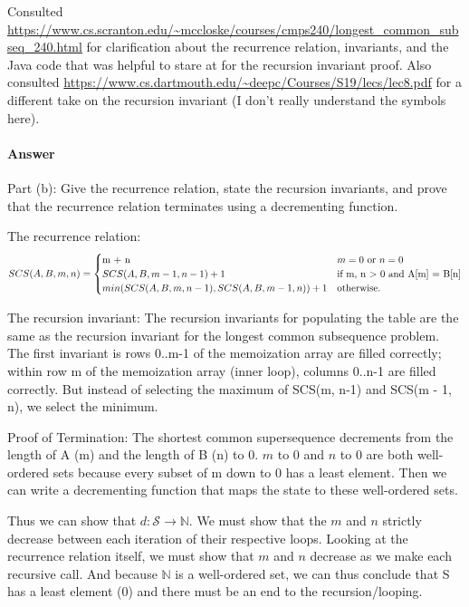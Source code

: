 \documentclass{article}
\begin{document}
Consulted \url{https://www.cs.scranton.edu/~mccloske/courses/cmps240/longest_common_subseq_240.html} for clarification about the recurrence relation, invariants, and the Java code that was helpful to stare at for the recursion invariant proof. Also consulted \url{https://www.cs.dartmouth.edu/~deepc/Courses/S19/lecs/lec8.pdf} for a different take on the recursion invariant (I don't really understand the symbols here). 

\newpage
\paragraph{Answer}{Part (b): Give the recurrence relation, state the recursion invariants, and prove that the recurrence relation terminates using a decrementing function.}

The recurrence relation: 
\begin{equation}
SCS(A, B, m, n) = 
\begin{cases}
   $m + n$ & \text{$m = 0$ or $n = 0$}\\
    SCS(A, B, m-1, n-1) + 1 & \text{if m, n $>$ 0 and A[m] = B[n]}\\
    min(SCS(A, B, m, n - 1), SCS(A, B, m - 1, n))+ 1 & \text{otherwise}.
  \end{cases}
\end{equation}

The recursion invariant: The recursion invariants for populating the table are the same as the recursion invariant for the longest common subsequence problem. The first invariant is rows 0..m-1 of the memoization array are filled correctly; within row m of the memoization array (inner loop), columns 0..n-1 are filled correctly. But instead of selecting the maximum of SCS(m, n-1) and SCS(m - 1, n), we select the minimum. 

Proof of Termination: The shortest common supersequence decrements from the length of A (m) and the length of B (n) to 0. $m$ to $0$ and $n$ to $0$ are both well-ordered sets because every subset of m down to 0 has a least element. Then we can write a decrementing function that maps the state to these well-ordered sets. 

Thus we can show that $d : \mathcal{S} \rightarrow \mathbb{N}$. We must show that the $m$ and $n$ strictly decrease between each iteration of their respective loops. Looking at the recurrence relation itself, we must show that $m$ and $n$ decrease as we make each recursive call. And because $\mathbb{N}$ is a well-ordered set, we can thus conclude that S has a least element (0) and there must be an end to the recursion/looping. 
\end{document}

